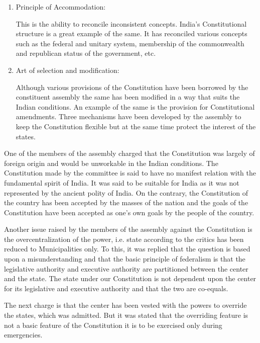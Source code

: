 \begin{multicols}{2}
\begin{enumerate}
\item Principle of Accommodation:

\noi
This is the ability to reconcile inconsistent concepts. India’s Constitutional structure is a great example of the same. It has reconciled various concepts such as the federal and unitary system, membership of the commonwealth and republican status of the government, etc.

\item Art of selection and modification:

\noi
Although various provisions of the Constitution have been borrowed by the constituent assembly the same has been modified in a way that suits the Indian conditions. An example of the same is the provision for Constitutional amendments. Three mechanisms have been developed by the assembly to keep the Constitution flexible but at the same time protect the interest of the states.
\end{enumerate}


\noi
One of the members of the assembly charged that the Constitution was largely of foreign origin and would be unworkable in the Indian conditions. The Constitution made by the committee is said to have no manifest relation with the fundamental spirit of India. It was said to be suitable for India as it was not represented by the ancient polity of India. On the contrary, the Constitution of the country has been accepted by the masses of the nation and the goals of the Constitution have been accepted as one’s own goals by the people of the country.

\noi
Another issue raised by the members of the assembly against the Constitution is the overcentralization of the power, i.e. state according to the critics has been reduced to Municipalities only. To this, it was replied that the question is based upon a misunderstanding and that the basic principle of federalism is that the legislative authority and executive authority are partitioned between the center and the state. The state under our Constitution is not dependent upon the center for its legislative and executive authority and that the two are co-equals.

\noi
The next charge is that the center has been vested with the powers to override the states, which was admitted. But it was stated that the overriding feature is not a basic feature of the Constitution it is to be exercised only during emergencies.


\end{multicols}
